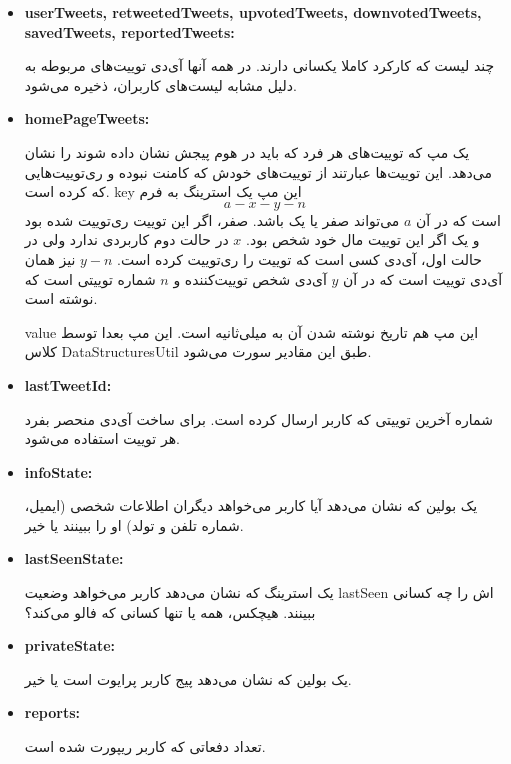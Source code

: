 \documentclass[12pt]{article}
\begin{document}
\begin{itemize}
\item
\begin{latin}
\textbf{userTweets, retweetedTweets, upvotedTweets, downvotedTweets, savedTweets, reportedTweets:}
\end{latin}
چند لیست که کارکرد کاملا یکسانی دارند. در همه آنها آی‌دی توییت‌های مربوطه به دلیل مشابه لیست‌های کاربران، ذخیره می‌شود.

\item
\begin{latin}
\textbf{homePageTweets:}
\end{latin}
یک مپ که توییت‌های هر فرد که باید در هوم پیجش نشان داده شوند را نشان می‌دهد. این توییت‌ها عبارتند از توییت‌های خودش که کامنت نبوده و ری‌توییت‌هایی که کرده است. key این مپ یک استرینگ به فرم
$$ a-x-y-n $$
است که در آن $a$ می‌تواند صفر یا یک باشد. صفر، اگر این توییت ری‌توییت شده بود و یک اگر این توییت مال خود شخص بود. $x$ در حالت دوم کاربردی ندارد ولی در حالت اول، آی‌دی کسی است که توییت را ری‌توییت کرده است. $y-n$ نیز همان آی‌دی توییت است که در آن $y$ آی‌دی شخص توییت‌کننده و $n$ شماره توییتی است که نوشته است.

value این مپ هم تاریخ نوشته شدن آن به میلی‌ثانیه است. این مپ بعدا توسط کلاس DataStructuresUtil طبق این مقادیر سورت می‌شود.

\item
\begin{latin}
\textbf{lastTweetId:}
\end{latin}
شماره آخرین توییتی که کاربر ارسال کرده است. برای ساخت آی‌دی منحصر بفرد هر توییت استفاده می‌شود.

\item
\begin{latin}
\textbf{infoState:}
\end{latin}
یک بولین که نشان می‌دهد آیا کاربر می‌خواهد دیگران اطلاعات شخصی (ایمیل، شماره تلفن و تولد) او را ببینند یا خیر.

\item
\begin{latin}
\textbf{lastSeenState:}
\end{latin}
یک استرینگ که نشان می‌دهد کاربر می‌خواهد وضعیت lastSeen اش را چه کسانی ببینند. هیچکس، همه یا تنها کسانی که فالو می‌کند؟

\item
\begin{latin}
\textbf{privateState:}
\end{latin}
یک بولین که نشان می‌دهد پیج کاربر پرایوت است یا خیر.

\item
\begin{latin}
\textbf{reports:}
\end{latin}
تعداد دفعاتی که کاربر ریپورت شده است.


\end{itemize}
\end{document}
